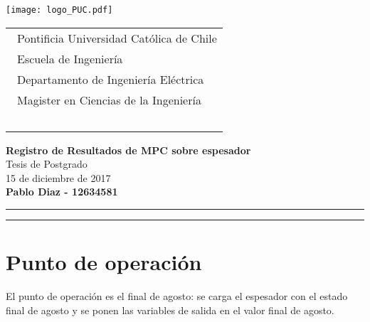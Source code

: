 \documentclass{article}
\begin{document}
\thispagestyle{empty}

\vspace*{-1cm}
\texttt{[image: logo\_PUC.pdf]}
\vspace*{-2cm}

\hspace*{2cm}
 \begin{tabular}{l}
  {\ Pontificia Universidad Católica de Chile}\\
  {\ Escuela de Ingeniería}\\
  {\ Departamento de Ingeniería Eléctrica}\\
  {\ Magister en Ciencias de la Ingeniería }\\
  {\  }\\
 \end{tabular}
 \hfill 
\vspace*{-0.2cm}
\begin{center}
{\Large\bf Registro de Resultados de MPC sobre espesador}\\
\vspace*{2mm}
{\Large Tesis de Postgrado}\\
{15 de diciembre de 2017}\\
\vspace*{1mm}
{\bf Pablo Diaz - 12634581 }\\
\vspace*{1mm}
\end{center}
\hrule\vspace*{2pt}\hrule
\setcounter{page}{1}
\section{Punto de operación}
El punto de operación es el final de agosto: se carga el espesador con el estado final de agosto y se ponen las variables de salida en el valor final de agosto.



\end{document}
